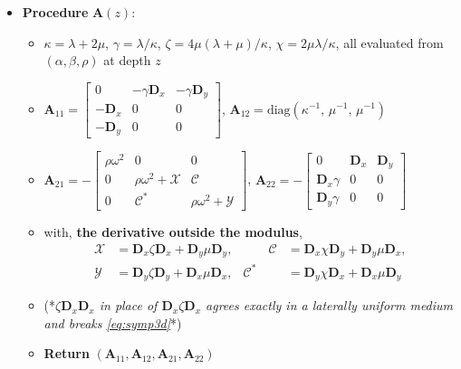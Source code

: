 \documentclass[11pt,a4paper]{article}
\newcommand{\bA}{\mathbf{A}}
\begin{document}
\begin{minipage}{\linewidth}
\begin{itemize}
\item \textbf{Procedure} $\bA(z)$:
\begin{itemize}
\item $\kappa=\lambda+2\mu$, \quad $\gamma=\lambda/\kappa$, \quad
      $\zeta = 4\mu(\lambda+\mu)/\kappa$, \quad $\chi = 2\mu\lambda/\kappa$,
      \quad all evaluated from $(\alpha,\beta,\rho)$ at depth $z$
\item $\bA_{11}=\begin{bmatrix}
        0 & -\gamma\mathbf{D}_x & -\gamma\mathbf{D}_y\\
        -\mathbf{D}_x & 0 & 0\\ -\mathbf{D}_y & 0 & 0\end{bmatrix}$,
      \qquad
      $\bA_{12}=\mathrm{diag}\!\left(\kappa^{-1},\,\mu^{-1},\,\mu^{-1}\right)$
\item $\bA_{21}=-\begin{bmatrix}
        \rho\omega^{2} & 0 & 0\\
        0 & \rho\omega^{2}+\mathcal{X} & \mathcal{C}\\
        0 & \mathcal{C}^{\ast} & \rho\omega^{2}+\mathcal{Y}\end{bmatrix}$,
      \qquad
      $\bA_{22}=-\begin{bmatrix}
        0 & \mathbf{D}_x & \mathbf{D}_y\\
        \mathbf{D}_x\gamma & 0 & 0\\
        \mathbf{D}_y\gamma & 0 & 0\end{bmatrix}$
\item with, \textbf{the derivative outside the modulus},
      \[
        \begin{aligned}
          \mathcal{X} &= \mathbf{D}_x\zeta\mathbf{D}_x
                       + \mathbf{D}_y\mu\mathbf{D}_y, &\qquad
          \mathcal{C} &= \mathbf{D}_x\chi\mathbf{D}_y
                       + \mathbf{D}_y\mu\mathbf{D}_x, \\
          \mathcal{Y} &= \mathbf{D}_y\zeta\mathbf{D}_y
                       + \mathbf{D}_x\mu\mathbf{D}_x, &
          \mathcal{C}^{\ast} &= \mathbf{D}_y\chi\mathbf{D}_x
                       + \mathbf{D}_x\mu\mathbf{D}_y
        \end{aligned}
      \]
\item (*{\em $\zeta\mathbf{D}_x\mathbf{D}_x$ in place of
      $\mathbf{D}_x\zeta\mathbf{D}_x$ agrees exactly in a laterally uniform
      medium and breaks \eqref{eq:symp3d}\/}*)
\item \textbf{Return} $(\bA_{11},\bA_{12},\bA_{21},\bA_{22})$
\end{itemize}


\end{itemize}
\end{minipage}
\end{document}
